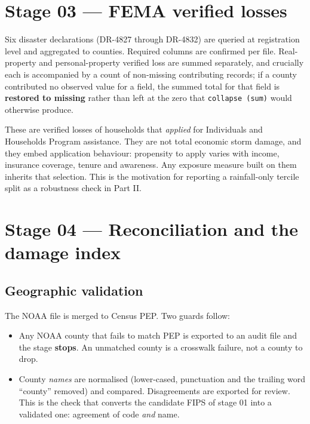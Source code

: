 \documentclass[11pt,a4paper]{article}
\newcommand{\caution}[2]{\begin{tcolorbox}[warnbox,title={#1}]#2\end{tcolorbox}}
\begin{document}
\section{Stage 03 --- FEMA verified losses}

Six disaster declarations (DR-4827 through DR-4832) are queried at
registration level and aggregated to counties. Required columns are confirmed
per file. Real-property and personal-property verified loss are summed
separately, and crucially each is accompanied by a count of non-missing
contributing records; if a county contributed no observed value for a field,
the summed total for that field is \textbf{restored to missing} rather than
left at the zero that \texttt{collapse (sum)} would otherwise produce.

\caution{What FEMA verified loss is, and is not}{%
These are verified losses of households that \emph{applied} for Individuals
and Households Program assistance. They are not total economic storm damage,
and they embed application behaviour: propensity to apply varies with income,
insurance coverage, tenure and awareness. Any exposure measure built on them
inherits that selection. This is the motivation for reporting a rainfall-only
tercile split as a robustness check in Part II.}

\section{Stage 04 --- Reconciliation and the damage index}

\subsection{Geographic validation}

The NOAA file is merged to Census PEP. Two guards follow:

\begin{itemize}[leftmargin=1.3em,itemsep=2pt]
\item Any NOAA county that fails to match PEP is exported to an audit file and
      the stage \textbf{stops}. An unmatched county is a crosswalk failure, not
      a county to drop.
\item County \emph{names} are normalised (lower-cased, punctuation and the
      trailing word ``county'' removed) and compared. Disagreements are
      exported for review. This is the check that converts the candidate FIPS
      of stage 01 into a validated one: agreement of code \emph{and} name.
\end{itemize}
\end{document}
